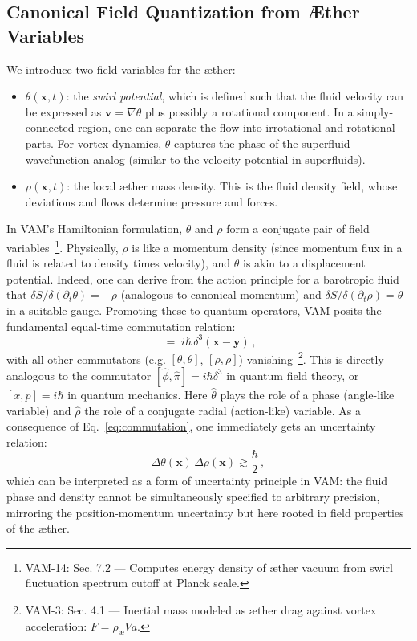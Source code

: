 \documentclass[a4paper,12pt]{article}
\begin{document}
    \subsection{Canonical Field Quantization from Æther Variables}
    We introduce two field variables for the æther:
    \begin{itemize}
        \item $\theta(\mathbf{x},t)$: the \emph{swirl potential}, which is defined such that the fluid velocity can be expressed as $\mathbf{v} = \nabla \theta$ plus possibly a rotational component. In a simply-connected region, one can separate the flow into irrotational and rotational parts. For vortex dynamics, $\theta$ captures the phase of the superfluid wavefunction analog (similar to the velocity potential in superfluids).
        \item $\rho(\mathbf{x},t)$: the local æther mass density. This is the fluid density field, whose deviations and flows determine pressure and forces.
    \end{itemize}
    In VAM’s Hamiltonian formulation, $\theta$ and $\rho$ form a conjugate pair of field variables~\footnote{VAM-14: Sec. 7.2 — Computes energy density of æther vacuum from swirl fluctuation spectrum cutoff at Planck scale.}. Physically, $\rho$ is like a momentum density (since momentum flux in a fluid is related to density times velocity), and $\theta$ is akin to a displacement potential. Indeed, one can derive from the action principle for a barotropic fluid that $\delta S / \delta (\partial_t \theta) = -\rho$ (analogous to canonical momentum) and $\delta S / \delta (\partial_t \rho) = \theta$ in a suitable gauge. Promoting these to quantum operators, VAM posits the fundamental equal-time commutation relation:
    \begin{equation}
    [\hat{\theta}(\mathbf{x}),\, \hat{\rho}(\mathbf{y})] \;=\; i \hbar \,\delta^3(\mathbf{x}-\mathbf{y})\,,
    \label{eq:commutation}
    \end{equation}
    with all other commutators (e.g. $[\theta,\theta]$, $[\rho,\rho]$) vanishing~\footnote{VAM-3: Sec. 4.1 — Inertial mass modeled as æther drag against vortex acceleration: $F = \rho_{\text{\ae}} V a$.}. This is directly analogous to the commutator $[ \hat{\phi}, \hat{\pi} ] = i\hbar \delta^3$ in quantum field theory, or $[x,p]=i\hbar$ in quantum mechanics. Here $\hat{\theta}$ plays the role of a phase (angle-like variable) and $\hat{\rho}$ the role of a conjugate radial (action-like) variable. As a consequence of Eq.~\eqref{eq:commutation}, one immediately gets an uncertainty relation:
    \[
        \Delta \theta(\mathbf{x}) \,\Delta \rho(\mathbf{x}) \gtrsim \frac{\hbar}{2}\,,
    \]
    which can be interpreted as a form of uncertainty principle in VAM: the fluid phase and density cannot be simultaneously specified to arbitrary precision, mirroring the position-momentum uncertainty but here rooted in field properties of the æther.
\end{document}
